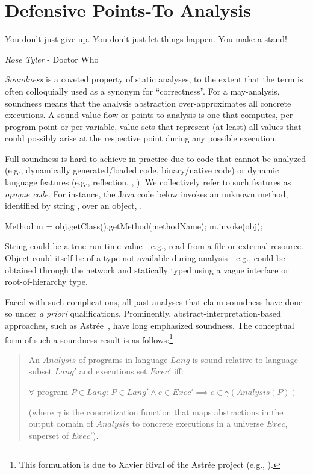 \chapter{Defensive Points-To Analysis}
\label{chapter:defensive}
\epigraph{You don’t just give up. You don’t just let things happen. You make a stand!}{\textit{Rose Tyler} - Doctor Who}

\emph{Soundness} is a coveted property of static analyses, to the extent that the term is often colloquially used as a synonym for ``correctness''. For a may-analysis, soundness means that the analysis abstraction over-approximates all concrete executions. A sound value-flow or points-to analysis is one that computes, per program point or per variable, value sets that represent (at least) all values that could possibly arise at the respective point during any possible execution.

Full soundness is hard to achieve in practice due to code that cannot be analyzed (e.g., dynamically generated/loaded code, binary/native code) or dynamic language features (e.g., reflection, , ). We collectively refer to such features as \emph{opaque code}. For instance, the Java code below invokes an unknown method, identified by string , over an object, .

\begin{javaBox}
Method m = obj.getClass().getMethod(methodName);
m.invoke(obj);  
\end{javaBox}

String  could be a true run-time value---e.g., read from a file or external resource. Object  could itself be of a type not available during analysis---e.g.,  could be obtained through the network and statically typed using a vague interface or root-of-hierarchy type.

Faced with such complications, all past analyses that claim soundness have done so under \emph{a priori} qualifications. Prominently, abstract-interpretation-based~\cite{popl:1977:Cousot} approaches, such as Astr\'{e}e~\cite{sas:2007:Delmas}, have long emphasized soundness. The conceptual form of such a soundness result is as follows:\footnote{This formulation is due to Xavier Rival of the Astr\'{e}e project (e.g., \cite{misc:Xavier}).}

\begin{quote}
An $Analysis$ of programs in language $Lang$ is sound relative to language subset $Lang'$ and executions set $Exec'$ iff:

\hspace{8 mm} $\forall$ program $P \in Lang$: $P \in Lang' \land e \in Exec' \implies e \in \gamma(Analysis(P))$

(where $\gamma$ is the concretization function that maps abstractions in the output domain of $Analysis$ to concrete executions in a universe $Exec$, superset of $Exec'$).
\end{quote}

